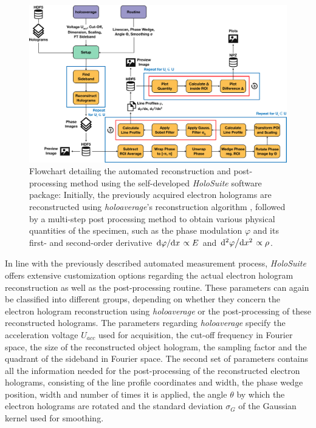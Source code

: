 \begin{figure}[H]
	\centering
	\includegraphics[width=\textwidth]{Figures/Schematics/Automation/flowchart-automatic-holography-post-processing.pdf}
	\caption{Flowchart detailing the automated reconstruction and post-processing method using the self-developed \emph{HoloSuite} software package: Initially, the previously acquired electron holograms are reconstructed using \emph{holoaverage}'s reconstruction algorithm \cite{Niermann2014}, followed by a multi-step post processing method to obtain various physical quantities of the specimen, such as the phase modulation $\varphi$ and its first- and second-order derivative $\dv*{\varphi}{x} \propto E$ and $\dv*[2]{\varphi}{x} \propto \rho$.}
	\label{fig:flowchart-automatic-holography-post-processing}
	\vspace*{-3mm}
\end{figure}
In line with the previously described automated measurement process, \emph{HoloSuite} offers extensive customization options regarding the actual electron hologram reconstruction as well as the post-processing routine. These parameters can again be classified into different groups, depending on whether they concern the electron hologram reconstruction using \emph{holoaverage} or the post-processing of these reconstructed holograms. The parameters regarding \emph{holoaverage} specify the acceleration voltage $U_{\mathit{acc}}$ used for acquisition, the cut-off frequency in Fourier space, the size of the reconstructed object hologram, the sampling factor and the quadrant of the sideband in Fourier space. The second set of parameters contains all the information needed for the post-processing of the reconstructed electron holograms, consisting of the line profile coordinates and width, the phase wedge position, width and number of times it is applied, the angle $\theta$ by which the electron holograms are rotated and the standard deviation $\sigma_G$ of the Gaussian kernel used for smoothing.

